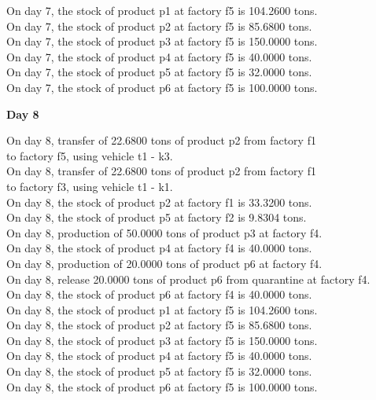 \begin{table}[H]
\begin{multicols}{2}
\begin{tabbing}
On day 7, the stock of product p1 at factory f5 is 104.2600 tons. \\
On day 7, the stock of product p2 at factory f5 is 85.6800 tons. \\
On day 7, the stock of product p3 at factory f5 is 150.0000 tons. \\
On day 7, the stock of product p4 at factory f5 is 40.0000 tons. \\
On day 7, the stock of product p5 at factory f5 is 32.0000 tons. \\
On day 7, the stock of product p6 at factory f5 is 100.0000 tons. \\
\end{tabbing} \vspace{-2.0em}
\textbf{Day 8}
\vspace{-1.6em}
\begin{tabbing}
On day 8, transfer of 22.6800 tons of product p2 from factory f1 \\ to factory f5, using vehicle t1 - k3. \\
On day 8, transfer of 22.6800 tons of product p2 from factory f1 \\ to factory f3, using vehicle t1 - k1. \\
On day 8, the stock of product p2 at factory f1 is 33.3200 tons. \\
On day 8, the stock of product p5 at factory f2 is 9.8304 tons. \\
On day 8, production of 50.0000 tons of product p3 at factory f4. \\
On day 8, the stock of product p4 at factory f4 is 40.0000 tons. \\
On day 8, production of 20.0000 tons of product p6 at factory f4. \\
On day 8, release 20.0000 tons of product p6 from quarantine at factory f4. \\
On day 8, the stock of product p6 at factory f4 is 40.0000 tons. \\
On day 8, the stock of product p1 at factory f5 is 104.2600 tons. \\
On day 8, the stock of product p2 at factory f5 is 85.6800 tons. \\
On day 8, the stock of product p3 at factory f5 is 150.0000 tons. \\
On day 8, the stock of product p4 at factory f5 is 40.0000 tons. \\
On day 8, the stock of product p5 at factory f5 is 32.0000 tons. \\
On day 8, the stock of product p6 at factory f5 is 100.0000 tons. \\

\end{tabbing}
\end{multicols}
\end{table}
